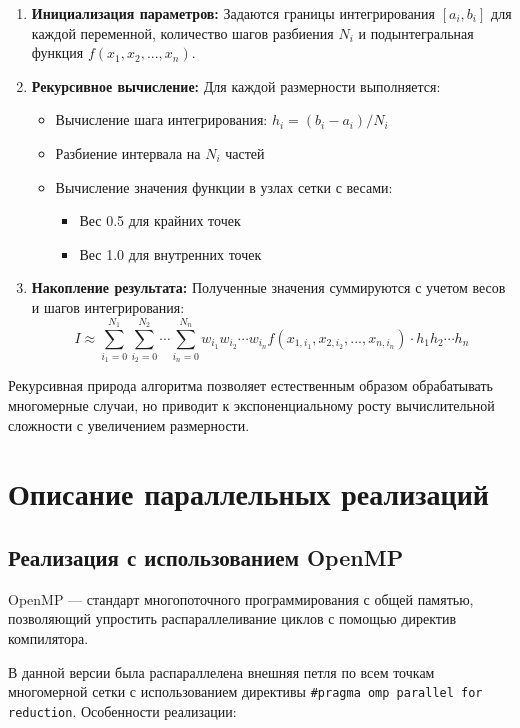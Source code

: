 \documentclass[14pt,a4paper]{extarticle}
\begin{document}
\begin{enumerate}
    \item \textbf{Инициализация параметров:} Задаются границы интегрирования $[a_i, b_i]$ для каждой переменной, количество шагов разбиения $N_i$ и подынтегральная функция $f(x_1, x_2, ..., x_n)$.
    
    \item \textbf{Рекурсивное вычисление:} Для каждой размерности выполняется:
    \begin{itemize}
        \item Вычисление шага интегрирования: $h_i = (b_i - a_i)/N_i$
        \item Разбиение интервала на $N_i$ частей
        \item Вычисление значения функции в узлах сетки с весами:
        \begin{itemize}
            \item Вес 0.5 для крайних точек
            \item Вес 1.0 для внутренних точек
        \end{itemize}
    \end{itemize}
    
    \item \textbf{Накопление результата:} Полученные значения суммируются с учетом весов и шагов интегрирования:
    $$I \approx \sum_{i_1=0}^{N_1} \sum_{i_2=0}^{N_2} \cdots \sum_{i_n=0}^{N_n} w_{i_1}w_{i_2}\cdots w_{i_n} f(x_{1,i_1}, x_{2,i_2}, ..., x_{n,i_n}) \cdot h_1h_2\cdots h_n$$
\end{enumerate}

Рекурсивная природа алгоритма позволяет естественным образом обрабатывать многомерные случаи, но приводит к экспоненциальному росту вычислительной сложности с увеличением размерности.
\newpage

\section{Описание параллельных реализаций}

\subsection{Реализация с использованием OpenMP}
OpenMP — стандарт многопоточного программирования с общей памятью, позволяющий упростить распараллеливание циклов с помощью директив компилятора.

В данной версии была распараллелена внешняя петля по всем точкам многомерной сетки с использованием директивы \texttt{\#pragma omp parallel for reduction}. Особенности реализации:
\end{document}
